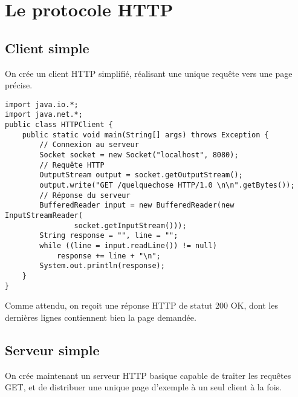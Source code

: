 \documentclass[a4paper]{article}
\begin{document}
\section{Le protocole HTTP}

\subsection{Client simple}

On crée un client HTTP simplifié, réalisant une unique requête vers une page précise.

\begin{lstlisting}
import java.io.*;
import java.net.*;
public class HTTPClient {
    public static void main(String[] args) throws Exception {
        // Connexion au serveur
        Socket socket = new Socket("localhost", 8080);
        // Requête HTTP
        OutputStream output = socket.getOutputStream();
        output.write("GET /quelquechose HTTP/1.0 \n\n".getBytes());
        // Réponse du serveur
        BufferedReader input = new BufferedReader(new InputStreamReader(
        		socket.getInputStream()));
        String response = "", line = "";
        while ((line = input.readLine()) != null)
            response += line + "\n";
        System.out.println(response);
    }
}
\end{lstlisting}

Comme attendu, on reçoit une réponse HTTP de statut 200 OK, dont les dernières lignes contiennent bien la page demandée.

\subsection{Serveur simple}

On crée maintenant un serveur HTTP basique capable de traiter les requêtes GET, et de distribuer une unique page d'exemple à un seul client à la fois.
\end{document}

